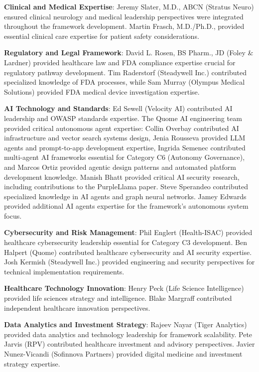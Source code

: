 \documentclass[11pt]{article}
\begin{document}
\textbf{Clinical and Medical Expertise}: Jeremy Slater, M.D., ABCN (Stratus Neuro) ensured clinical neurology and medical leadership perspectives were integrated throughout the framework development. Martin Frasch, M.D./Ph.D., provided essential clinical care expertise for patient safety considerations.

\textbf{Regulatory and Legal Framework}: David L. Rosen, BS Pharm., JD (Foley \& Lardner) provided healthcare law and FDA compliance expertise crucial for regulatory pathway development. Tim Raderstorf (Steadywell Inc.) contributed specialized knowledge of FDA processes, while Sam Murray (Olympus Medical Solutions) provided FDA medical device investigation expertise.

\textbf{AI Technology and Standards}: Ed Sewell (Velocity AI) contributed AI leadership and OWASP standards expertise. The Quome AI engineering team provided critical autonomous agent expertise: Collin Overbay contributed AI infrastructure and vector search systems design, Jenia Rousseva provided LLM agents and prompt-to-app development expertise, Ingrida Semenec contributed multi-agent AI frameworks essential for Category C6 (Autonomy Governance), and Marcos Ortiz provided agentic design patterns and automated platform development knowledge. Manish Bhatt provided critical AI security research, including contributions to the PurpleLlama paper. Steve Sperandeo contributed specialized knowledge in AI agents and graph neural networks. Jamey Edwards provided additional AI agents expertise for the framework's autonomous system focus.

\textbf{Cybersecurity and Risk Management}: Phil Englert (Health-ISAC) provided healthcare cybersecurity leadership essential for Category C3 development. Ben Halpert (Quome) contributed healthcare cybersecurity and AI security expertise. Josh Kermish (Steadywell Inc.) provided engineering and security perspectives for technical implementation requirements.

\textbf{Healthcare Technology Innovation}: Henry Peck (Life Science Intelligence) provided life sciences strategy and intelligence. Blake Margraff contributed independent healthcare innovation perspectives.

\textbf{Data Analytics and Investment Strategy}: Rajeev Nayar (Tiger Analytics) provided data analytics and technology leadership for framework scalability. Pete Jarvis (RPV) contributed healthcare investment and advisory perspectives. Javier Nunez-Vicandi (Sofinnova Partners) provided digital medicine and investment strategy expertise.
\end{document}
